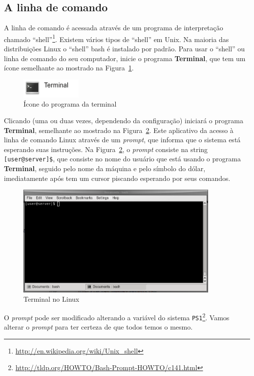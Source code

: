 \documentclass[letter,11pt]{book}
\begin{document}
\subsection{A linha de comando}

A linha de comando é acessada através de um programa de interpretação chamado ``shell''\footnote{\url{http://en.wikipedia.org/wiki/Unix_shell}}.  Existem vários tipos de ``shell'' em Unix. Na maioria das distribuições Linux o ``shell'' bash é instalado por padrão. Para usar o ``shell'' ou linha de comando do seu computador, inicie o programa \textbf{Terminal}, que tem um ícone semelhante ao mostrado na Figura~\ref{terminalico}.

\begin{figure}[ht]
\centering
   \includegraphics[width=3cm]{Figs/terminalico.png}
  \caption{\label{terminalico}Ícone do programa da terminal}
\end{figure}

Clicando (uma ou duas vezes, dependendo da configuração) iniciará o programa \textbf{Terminal}, semelhante ao mostrado na Figura~\ref{terminal}. Este aplicativo da acesso à linha de comando Linux através de um \textit{prompt}, que informa que o sistema está esperando suas instruções. Na Figura~\ref{terminal}, o \textit{prompt} consiste na string \Verb+[user@server]$+, que consiste no nome do usuário que está usando o programa \textbf{Terminal}, seguido pelo nome da máquina e pelo símbolo do dólar, imediatamente após tem um cursor piscando esperando por seus comandos.

\begin{figure}[ht]
\centering
   \includegraphics[width=10cm]{Figs/terminal.png}
  \caption{\label{terminal}Terminal no Linux}
\end{figure}

O \textit{prompt} pode ser modificado alterando a variável do sistema \Verb+PS1+\footnote{\url{http://tldp.org/HOWTO/Bash-Prompt-HOWTO/c141.html}}. Vamos alterar o \textit{prompt} para ter certeza de que todos temos o mesmo.
\end{document}
